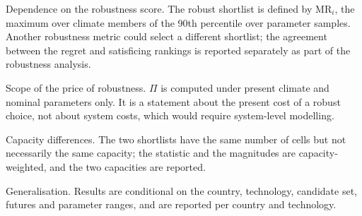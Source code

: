 Dependence on the robustness score. The robust shortlist is defined by
$\mathrm{MR}_i$, the maximum over climate members of the 90th percentile over
parameter samples. Another robustness metric could select a different shortlist;
the agreement between the regret and satisficing rankings is reported separately
as part of the robustness analysis.

Scope of the price of robustness. $\Pi$ is computed under present climate and
nominal parameters only. It is a statement about the present cost of a robust
choice, not about system costs, which would require system-level modelling.

Capacity differences. The two shortlists have the same number of cells but not
necessarily the same capacity; the statistic and the magnitudes are
capacity-weighted, and the two capacities are reported.

Generalisation. Results are conditional on the country, technology, candidate
set, futures and parameter ranges, and are reported per country and technology.

